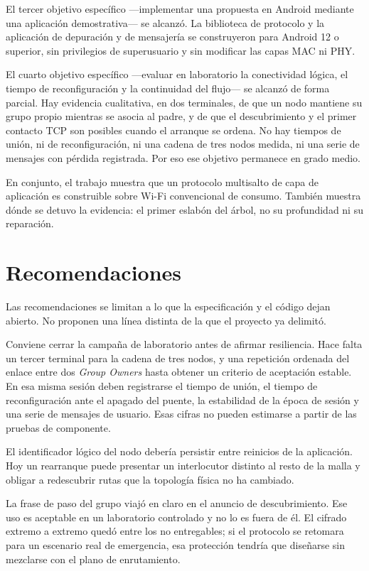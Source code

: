 \documentclass[12pt,oneside]{scrreprt}
\begin{document}
El tercer objetivo específico ---implementar una propuesta en Android mediante una aplicación demostrativa--- se alcanzó. La biblioteca de protocolo y la aplicación de depuración y de mensajería se construyeron para Android 12 o superior, sin privilegios de superusuario y sin modificar las capas MAC ni PHY.

El cuarto objetivo específico ---evaluar en laboratorio la conectividad lógica, el tiempo de reconfiguración y la continuidad del flujo--- se alcanzó de forma parcial. Hay evidencia cualitativa, en dos terminales, de que un nodo mantiene su grupo propio mientras se asocia al padre, y de que el descubrimiento y el primer contacto TCP son posibles cuando el arranque se ordena. No hay tiempos de unión, ni de reconfiguración, ni una cadena de tres nodos medida, ni una serie de mensajes con pérdida registrada. Por eso ese objetivo permanece en grado medio.

En conjunto, el trabajo muestra que un protocolo multisalto de capa de aplicación es construible sobre Wi-Fi convencional de consumo. También muestra dónde se detuvo la evidencia: el primer eslabón del árbol, no su profundidad ni su reparación.

\section{Recomendaciones}
\label{ch:recomendaciones}
Las recomendaciones se limitan a lo que la especificación y el código dejan abierto. No proponen una línea distinta de la que el proyecto ya delimitó.

Conviene cerrar la campaña de laboratorio antes de afirmar resiliencia. Hace falta un tercer terminal para la cadena de tres nodos, y una repetición ordenada del enlace entre dos \emph{Group Owners} hasta obtener un criterio de aceptación estable. En esa misma sesión deben registrarse el tiempo de unión, el tiempo de reconfiguración ante el apagado del puente, la estabilidad de la época de sesión y una serie de mensajes de usuario. Esas cifras no pueden estimarse a partir de las pruebas de componente.

El identificador lógico del nodo debería persistir entre reinicios de la aplicación. Hoy un rearranque puede presentar un interlocutor distinto al resto de la malla y obligar a redescubrir rutas que la topología física no ha cambiado.

La frase de paso del grupo viajó en claro en el anuncio de descubrimiento. Ese uso es aceptable en un laboratorio controlado y no lo es fuera de él. El cifrado extremo a extremo quedó entre los no entregables; si el protocolo se retomara para un escenario real de emergencia, esa protección tendría que diseñarse sin mezclarse con el plano de enrutamiento.
\end{document}
